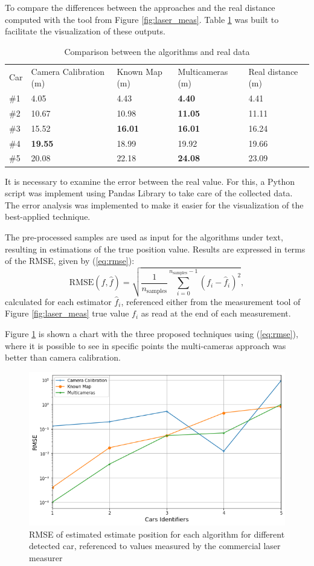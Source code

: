 To compare the differences between the approaches and the real distance computed with the tool from Figure \ref{fig:laser_meas}. Table \ref{tab:total} was built to facilitate the visualization of these outputs. 


\begin{table}[H]
\centering
\caption{Comparison between the algorithms and real data}
\begin{tabular}{l|l|l|l|l} 
\toprule
Car & Camera Calibration (m) & Known Map (m) & Multicameras (m) & Real distance (m) \\
\#1   & 4.05          & 4.43           & \textbf{4.40 }          & 4.41 \\
\#2   & 10.67         & 10.98          & \textbf{11.05 }         & 11.11\\
\#3   & 15.52         & \textbf{16.01}          &\textbf{ 16.01 }         & 16.24\\
\#4   & \textbf{19.55}         & 18.99          & 19.92          & 19.66\\
\#5   & 20.08         & 22.18          & \textbf{24.08}          & 23.09\\
\bottomrule
\end{tabular}
\label{tab:total}
\end{table} 

It is necessary to examine the error between the real value. For this, a Python script was implement using Pandas Library \cite{mckinney2011pandas} to take care of the collected data. The error analysis was implemented to make it easier for the visualization of the best-applied technique. 

The pre-processed samples are used as input for the algorithms under text, resulting in estimations of the true position value. Results are expressed in terms of the RMSE, given by (\ref{eq:rmse}):
%
\begin{equation} \label{eq:rmse}
\text{RMSE}(f, \hat{f}) = \sqrt{\frac{1}{n_\text{samples}} \sum_{i=0}^{n_\text{samples} - 1} (f_i - \hat{f}_i)^2},
\end{equation}
%
calculated for each estimator $\hat{f}_i$, referenced either from the measurement tool of Figure \ref{fig:laser_meas} true value $f_i$ as read at the end of each measurement.

Figure \ref{fig:rmse} is shown a chart with the three proposed techniques using (\ref{eq:rmse}), where it is possible to see in specific points the multi-cameras approach was better than camera calibration.

\begin{figure}[H]
\centering
\includegraphics[scale=0.6]{imagens/plot.png}
\caption{RMSE of estimated estimate position for each algorithm for different detected car, referenced to values measured by the commercial laser measurer}
\label{fig:rmse}
\end{figure}